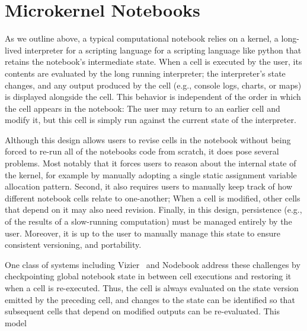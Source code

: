 \section{Microkernel Notebooks}
As we outline above, a typical computational notebook relies on a kernel, a long-lived interpreter for a scripting language for a scripting language like python that retains the notebook's intermediate state.
When a cell is executed by the user, its contents are evaluated by the long running interpreter; the interpreter's state changes, and any output produced by the cell (e.g., console logs, charts, or maps) is displayed alongside the cell.
This behavior is independent of the order in which the cell appears in the notebook: The user may return to an earlier cell and modify it, but this cell is simply run against the current state of the interpreter.

Although this design allows users to revise cells in the notebook without being forced to re-run all of the notebooks code from scratch, it does pose several problems.
Most notably that it forces users to reason about the internal state of the kernel, for example by manually adopting a single static assignment variable allocation pattern.
Second, it also requires users to manually keep track of how different notebook cells relate to one-another; When a cell is modified, other cells that depend on it may also need revision.
Finally, in this design, persistence (e.g., of the results of a slow-running computation) must be managed entirely by the user.
Moreover, it is up to the user to manually manage this state to ensure consistent versioning, and portability.

One class of systems including Vizier~\cite{BS20,BB19} and Nodebook address these challenges by checkpointing global notebook state in between cell executions and restoring it when a cell is re-executed.
Thus, the cell is always evaluated on the state version emitted by the preceding cell, and changes to the state can be identified so that subsequent cells that depend on modified outputs can be re-evaluated.
This model 


